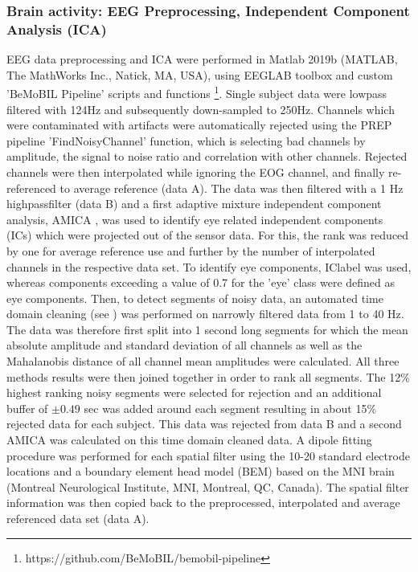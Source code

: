 \subsubsection{Brain activity: EEG Preprocessing, Independent Component Analysis (ICA)}
EEG data preprocessing and ICA were performed in Matlab 2019b (MATLAB, The MathWorks Inc., Natick, MA, USA), using EEGLAB toolbox \cite{Delorme2004a} and custom 'BeMoBIL Pipeline' scripts and functions \footnote{https://github.com/BeMoBIL/bemobil-pipeline}. Single subject data were lowpass filtered with 124Hz and subsequently down-sampled to 250Hz. Channels which were contaminated with artifacts were automatically rejected using the PREP pipeline \cite{Bigdely-Shamlo2015} 'FindNoisyChannel' function, which is selecting bad channels by amplitude, the signal to noise ratio and correlation with other channels. Rejected channels were then interpolated while ignoring the EOG channel, and finally re-referenced to average reference (data A). The data was then filtered with a 1 Hz highpassfilter (data B) and a first adaptive mixture independent component analysis, AMICA \cite{Palmer2011}, was used to identify eye related independent components (ICs) which were projected out of the sensor data. For this, the rank was reduced by one for average reference use and further by the number of interpolated channels in the respective data set. To identify eye components, IClabel \cite{Pion-Tonachini2019} was used, whereas components exceeding a value of 0.7 for the 'eye' class were defined as eye components. Then, to detect segments of noisy data, an automated time domain cleaning (see \citet{Gramann2018}) was performed on narrowly filtered data from 1 to 40 Hz. The data was therefore first split into 1 second long segments for which the mean absolute amplitude and standard deviation of all channels as well as the Mahalanobis distance of all channel mean amplitudes were calculated. All three methods results were then joined together in order to rank all segments. The 12\% highest ranking noisy segments were selected for rejection and an additional buffer of $\pm 0.49$ sec was added around each segment resulting in about 15\% rejected data for each subject. This data was rejected from data B and a second AMICA was calculated on this time domain cleaned data. A dipole fitting procedure was performed for each spatial filter using the 10-20 standard electrode locations and a boundary element head model (BEM) based on the MNI brain (Montreal Neurological Institute, MNI, Montreal, QC, Canada). The spatial filter information was then copied back to the preprocessed, interpolated and average referenced data set (data A). 

